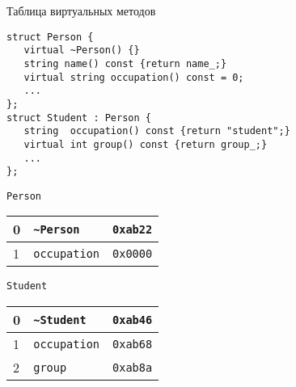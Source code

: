 \documentclass{beamer}
\begin{document}
\begin{frame}[fragile]{Таблица виртуальных методов}
    \begin{lstlisting}
struct Person {
   virtual ~Person() {}
   string name() const {return name_;}
   virtual string occupation() const = 0;
   ...
};
struct Student : Person {
   string  occupation() const {return "student";}
   virtual int group() const {return group_;}
   ...
};
    \end{lstlisting}

\begin{minipage}{3cm}
    {\tt Person}
    \begin{tabular}{|l|l|l|}
        \hline
        0 & \texttt{\textasciitilde{}Person}   & \texttt{0xab22} \\\hline
        1 & \texttt{occupation} & \texttt{0x0000} \\\hline
    \end{tabular}\vspace{4.8mm}\mbox{}
\end{minipage}\hspace{2cm}
\begin{minipage}{3cm}
    {\tt Student}
    \begin{tabular}{|l|l|l|}
        \hline
        0 & \texttt{\textasciitilde{}Student} &  \texttt{0xab46} \\\hline
        1 & \texttt{occupation} & \texttt{0xab68} \\\hline
        2 & \texttt{group} & \texttt{0xab8a}     \\\hline
    \end{tabular}
\end{minipage}
\end{frame}
\end{document}
